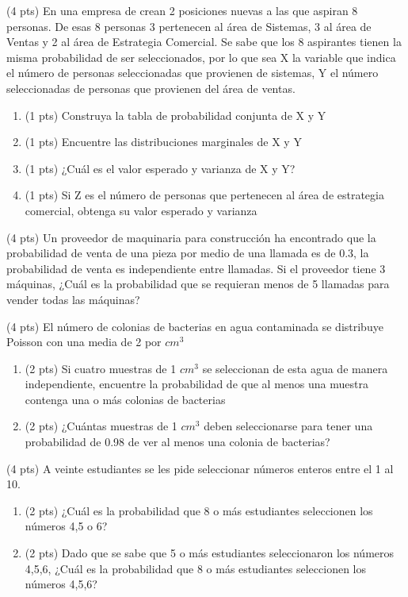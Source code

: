 \documentclass[addpoints]{exam}
\theoremstyle{mytheor}
\begin{document}
\begin{questions}
\question (4 pts)
En una empresa de crean 2 posiciones nuevas a las que aspiran 8 personas. De esas 8 personas 3 pertenecen al área de Sistemas, 3 al área de Ventas y 2 al área de Estrategia Comercial. Se sabe que los 8 aspirantes tienen la misma probabilidad de ser seleccionados, por lo que sea X la variable que indica el número de personas seleccionadas que provienen de sistemas, Y el número seleccionadas de personas que provienen del área de ventas.
\begin{enumerate}[label=\Alph*)]
\item (1 pts) Construya la tabla de probabilidad conjunta de X y Y
\item (1 pts) Encuentre las distribuciones marginales de X y Y
\item (1 pts) ¿Cuál es el valor esperado y varianza de X y Y?
\item (1 pts) Si Z es el número de personas que pertenecen al área de estrategia comercial, obtenga su valor esperado y varianza
\end{enumerate}
 
\question (4 pts) Un proveedor de maquinaria para construcción ha encontrado que la probabilidad de venta de una pieza por medio de una llamada es de 0.3, la probabilidad de venta es independiente entre llamadas. Si el proveedor tiene 3 máquinas, ¿Cuál es la probabilidad que se requieran menos de 5 llamadas para vender todas las máquinas?
  
 
\question (4 pts) El número de colonias de bacterias en agua contaminada se distribuye Poisson con una media de 2 por $cm^3$
\begin{enumerate}[label=\Alph*)]
\item (2 pts) Si cuatro muestras de 1 $cm^3$ se seleccionan de esta agua de manera independiente, encuentre la probabilidad de que al menos una muestra contenga una o más colonias de bacterias
\item (2 pts) ¿Cuántas muestras de 1 $cm^3$ deben seleccionarse para tener una probabilidad de 0.98 de ver al menos una colonia de bacterias?
\end{enumerate}

\question (4 pts)  A veinte estudiantes se les pide seleccionar números enteros entre el 1 al 10.
\begin{enumerate}[label=\Alph*)]
\item (2 pts) ¿Cuál es la probabilidad que 8 o más estudiantes seleccionen los números 4,5 o 6?
\item (2 pts) Dado que se sabe que 5 o más estudiantes seleccionaron los números 4,5,6, ¿Cuál es la probabilidad que 8 o más estudiantes seleccionen los números 4,5,6?
\end{enumerate}


\end{questions}
\end{document}
